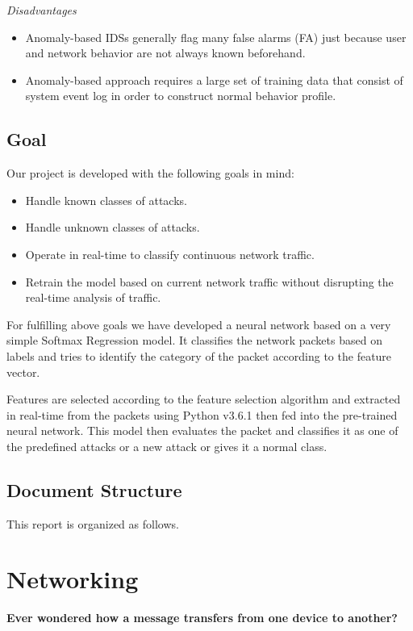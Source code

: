 \documentclass[12pt]{article}
\theoremstyle{definition}
\begin{document}
			\textit{Disadvantages}
			\begin{itemize}
				\item Anomaly-based IDSs generally flag many false alarms (FA) just because user and network behavior are not always known beforehand.
				\item Anomaly-based approach requires a large set of training data that consist of system event log in order to construct normal behavior profile.
			\end{itemize}
			
		\subsection{Goal}\label{intro:goal}
		Our project is developed with the following goals in mind:
		
		\begin{itemize}
			\item Handle known classes of attacks.
			\item Handle unknown classes of attacks.
			\item Operate in real-time to classify continuous network traffic.
			\item Retrain the model based on current network traffic without disrupting the real-time analysis of traffic.
		\end{itemize}
	
		For fulfilling above goals we have developed a neural network based on a very simple Softmax Regression model. It classifies the network packets based on labels and tries to identify the category of the packet according to the feature vector.
		
		Features are selected according to the feature selection algorithm and extracted in real-time from the packets using Python v3.6.1 then fed into the pre-trained neural network. This model then evaluates the packet and classifies it as one of the predefined attacks or a new attack or gives it a normal class.
		
		\subsection{Document Structure}
		This report is organized as follows. %
	
	
	\cleardoublepage
	\section{Networking}\label{sec:netwrk}
	\textbf{Ever wondered how a message transfers from one device to another?}\\ 
	
\end{document}
